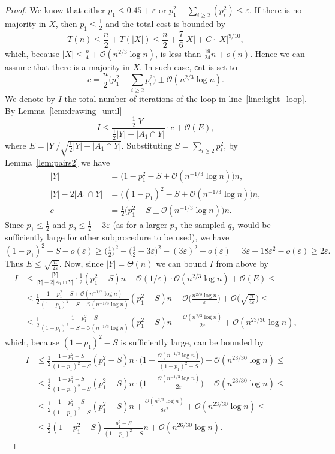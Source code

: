 \documentclass{article}[11pt,a4paper]
\newcommand{\bigo}{\mathcal{O}}
\newcommand{\cnt}{\mathsf{cnt}}
\begin{document}
\begin{proof}
We know that either $p_1 \le 0.45+\varepsilon$ or $p_1^2 - \sum_{i\geq 2}(p_i^2) \le \varepsilon$.
If there is no majority in $X$, then $p_1 \le \frac{1}{2}$ and the total cost is bounded by
\[T(n) \le \frac{n}{2} + T(|X|) \le \frac{n}{2} + \frac{7}{6} |X| + C \cdot |X|^{9/10},\]
which, because $|X| \leq \frac{n}{4}+\bigo(n^{2/3}\log n)$, is less than $\frac{19}{24}n+o(n)$.
Hence we can assume that there is a majority in $X$. In such case, $\cnt$ is set to
\[c = \frac{n}{2} \biggl(p_1^2 - \sum_{i\geq 2}p_i^2\biggr) \pm \bigo(n^{2/3} \log n).\]
We denote by $I$ the total number of iterations of the loop in line~\ref{line:light_loop}.
By Lemma~\ref{lem:drawing_until}
\[I \le \frac{\frac12 |Y|}{\frac12|Y| - |A_1 \cap Y|}  \cdot c + \bigo(E), \]
where $E = |Y| / \sqrt{\frac12|Y| - |A_1 \cap Y|}$.
Substituting $S = \sum_{i\geq 2}p_i^2$, by Lemma~\ref{lem:pairs2} we have
\begin{align*}
|Y| &= \bigl(1 - p_1^2 - S \pm \bigo(n^{-1/3}\log n)\bigr)n, \\
|Y| - 2|A_1 \cap Y| &= \bigl((1 - p_1)^2 - S \pm \bigo(n^{-1/3}\log n)\bigr)n, \\
c &=\frac12\bigl( p_1^2 - S \pm \bigo(n^{-1/3}\log n)\bigr)n.
\end{align*}
Since $p_1 \le \frac12$ and $p_2 \le \frac12-3\varepsilon$ (as for a larger $p_2$ the sampled
$q_2$ would be sufficiently large for other subprocedure to be used),
we have \[(1-p_1)^2-S - o(\varepsilon) \ge \bigl(\tfrac12\bigr)^2-\bigl(\tfrac12-3\varepsilon\bigr)^2-(3\varepsilon)^2 - o(\varepsilon) = 3\varepsilon - 18\varepsilon^2 - o(\varepsilon) \ge 2\varepsilon.\] Thus  $E \le \sqrt{\frac{n}{2\varepsilon}}$. Now, since $|Y| = \Theta(n)$ we can bound $I$ from above by
\begin{align*}
I & \le \frac{|Y|}{|Y|-2|A_1\cap Y|}\cdot \frac12(p_1^2-S)n + \bigo(1/\varepsilon)\cdot \bigo(n^{2/3}\log n) + \bigo(E) \le \\
& \le \frac{1}{2}\frac{1-p_1^2-S+\bigo(n^{-1/3}\log n)}{(1-p_1)^2-S-\bigo(n^{-1/3}\log n)}(p_1^2-S)n + \bigo\biggl(\frac{n^{2/3}\log n}{\varepsilon}\biggr) + \bigo\biggl(\sqrt{\frac{n}{4\varepsilon}}\biggr)\le \\
& \le \frac{1}{2}\frac{1-p_1^2-S}{(1-p_1)^2-S-\bigo(n^{-1/3}\log n)}(p_1^2-S)n +\frac{\bigo(n^{2/3}\log n)}{2\varepsilon} + \bigo(n^{23/30}\log n),
\end{align*}
which, because $(1-p_1)^2-S$ is sufficiently large, can be bounded by
\begin{align*}
I & \le \frac{1}{2}\frac{1-p_1^2-S}{(1-p_1)^2-S}(p_1^2-S)n\cdot \biggl(1+\frac{\bigo(n^{-1/3}\log n)}{(1-p_1)^2-S}\biggr)  + \bigo(n^{23/30}\log n) \le \\
& \le \frac{1}{2}\frac{1-p_1^2-S}{(1-p_1)^2-S}(p_1^2-S)n\cdot \biggl(1+\frac{\bigo(n^{-1/3}\log n)}{2\varepsilon}\biggr)  + \bigo(n^{23/30}\log n) \le \\
& \le \frac{1}{2}\frac{1-p_1^2-S}{(1-p_1)^2-S}(p_1^2-S)n+\frac{\bigo(n^{2/3}\log n)}{8\varepsilon^2}  + \bigo(n^{23/30}\log n) \le \\
&\le\frac{1}{2}(1-p_1^2-S)\frac{p_1^2-S}{(1-p_1)^2-S}n + \bigo(n^{26/30}\log n).
\end{align*}


\end{proof}
\end{document}
